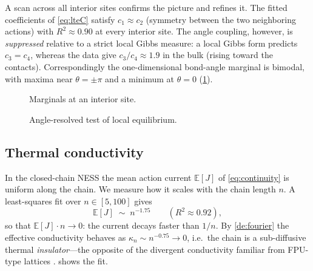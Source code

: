 \documentclass[11pt,a4paper]{article}
\theoremstyle{definition}
\newcommand{\E}{\mathbb{E}}
\numberwithin{equation}{section}   %
\begin{document}
A scan across all interior sites confirms the picture and refines it. The fitted
coefficients of \eqref{eq:lteC} satisfy $c_1\approx c_2$ (symmetry between the
two neighboring actions) with $R^2\approx0.90$ at every interior site. The
angle coupling, however, is \emph{suppressed} relative to a strict local Gibbs
measure: a local Gibbs form predicts $c_3=c_4$, whereas the data give
$c_3/c_4\approx1.9$ in the bulk (rising toward the contacts). Correspondingly
the one-dimensional bond-angle marginal is bimodal, with maxima near
$\theta=\pm\pi$ and a minimum at $\theta=0$ (\cref{fig:lte-marg}).

\begin{figure}[ht]
  \centering
  \caption{Marginals at an interior site.}
  \label{fig:lte-marg}
\end{figure}

\begin{figure}[ht]
  \centering
  \caption{Angle-resolved test of local equilibrium.}
  \label{fig:lte-slices}
\end{figure}

\subsection{Thermal conductivity}\label{sec:thermal-conductivity}

In the closed-chain NESS the mean action current $\E[J]$ of
\eqref{eq:continuity} is uniform along the chain. We measure how it scales with
the chain length $n$. A least-squares fit over $n\in[5,100]$ gives
\begin{equation}\label{eq:flux-scaling}
  \E[J] \;\sim\; n^{-1.75}\qquad (R^2\approx0.92),
\end{equation}
so that $\E[J]\cdot n\to0$: the current decays faster than $1/n$. By
\cref{de:fourier} the effective conductivity behaves as $\kappa_n\sim n^{-0.75}
\to 0$, i.e.\ the chain is a sub-diffusive thermal \emph{insulator}---the
opposite of the divergent conductivity familiar from FPU-type lattices
\cite{LepriLiviPoliti}.  shows the fit.
\end{document}
